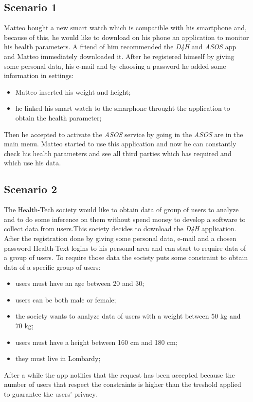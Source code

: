 \subsection{Scenario 1}
Matteo bought a new smart watch which is compatible with his smartphone and, because of this, he would like to download on his phone an application to monitor his health parameters. 
A friend of him recommended the \textit{D4H} and \textit{ASOS} app and Matteo immediately downloaded it. After he registered himself by giving some personal data, his e-mail and by choosing a password he added some information in settings:
\begin{itemize}
	\item {Matteo inserted his weight and height;}
	\item {he linked his smart watch to the smarphone throught the application to obtain the health parameter;}
\end{itemize}
Then he accepted to activate the \textit{ASOS} service by going in the \textit{ASOS} are in the main menu.
Matteo started to use this application and now he can constantly check his health parameters and see all third parties which has required and which use his data.

\subsection{Scenario 2}
The Health-Tech society would like to obtain data of group of users to analyze and to do some inference on them without spend money to develop a software to collect data from users.This society decides to download the \textit{D4H} application.
After the registration done by giving some personal data, e-mail and a chosen password Health-Text logins to his personal area and can start to require data of a group of users. To require those data the society puts some constraint to obtain data of a specific group of users:
\begin{itemize}
	\item {users must have an age between 20 and 30;}
	\item {users can be both male or female;}
	\item {the society wants to analyze data of users with a weight between 50 kg and 70 kg;}
	\item {users must have a height between 160 cm and 180 cm;}
	\item {they must live in Lombardy;}
\end{itemize}
After a while the app notifies that the request has been accepted because the number of users that respect the constraints is higher than the treshold applied to guarantee the users' privacy.

